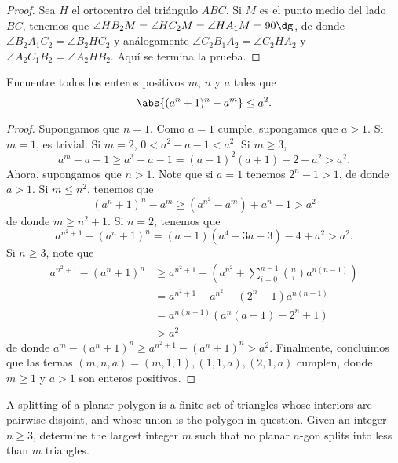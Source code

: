 \begin{proof}
	Sea $H$ el ortocentro del triángulo $ABC$. Si $M$ es el punto medio del lado $BC$, tenemos que $\angle HB_2M=\angle HC_2M=\angle HA_1M=90\dg$, de donde $\angle B_2A_1C_2=\angle B_2HC_2$ y análogamente $\angle C_2B_1A_2=\angle C_2HA_2$ y $\angle A_2C_1B_2=\angle A_2HB_2$. Aquí se termina la prueba.
\end{proof}

\begin{probMB}
	Encuentre todos los enteros positivos $m$, $n$ y $a$ tales que
	\[\abs{(a^n+1)^n-a^m}\le a^2.\]
\end{probMB}

\begin{proof}
	Supongamos que $n=1$. Como $a=1$ cumple, supongamos que $a>1$. Si $m=1$, es trivial. Si $m=2$, $0<a^2-a-1<a^2$. Si $m\ge 3$,
	\[a^m-a-1\ge a^3-a-1=(a-1)^2(a+1)-2+a^2>a^2.\]
	Ahora, supongamos que $n>1$. Note que si $a=1$ tenemos $2^n-1>1$, de donde $a>1$. Si $m\le n^2$, tenemos que
	\[(a^n+1)^n-a^m\ge \left(a^{n^2}-a^m\right)+a^n+1>a^2\]
	de donde $m\ge n^2+1$. Si $n=2$, tenemos que
	\[a^{n^2+1}-(a^n+1)^n=(a-1)(a^4-3a-3)-4+a^2>a^2.\]
	Si $n\ge 3$, note que
	\begin{align*}
		a^{n^2+1}-(a^n+1)^n
		&\ge a^{n^2+1}-\left(a^{n^2}+\sum_{i=0}^{n-1}\binom{n}{i}a^{n(n-1)}\right)\\
		&=a^{n^2+1}-a^{n^2}-(2^n-1)a^{n(n-1)}\\
		&=a^{n(n-1)}\left(a^n(a-1)-2^n+1\right)\\
		&>a^2
	\end{align*}
	de donde $a^m-(a^n+1)^n\ge a^{n^2+1}-(a^n+1)^n>a^2$. Finalmente, concluimos que las ternas $(m,n,a)=(m,1,1),(1,1,a),(2,1,a)$ cumplen, donde $m\ge 1$ y $a>1$ son enteros positivos.
\end{proof}

\note[Miscelánea]{}

\begin{probEG}
	A splitting of a planar polygon is a finite set of triangles whose interiors are pairwise disjoint, and whose union is the polygon in question. Given an integer $n\ge 3$, determine the largest integer $m$ such that no planar $n$-gon splits into less than $m$ triangles.
\end{probEG}

